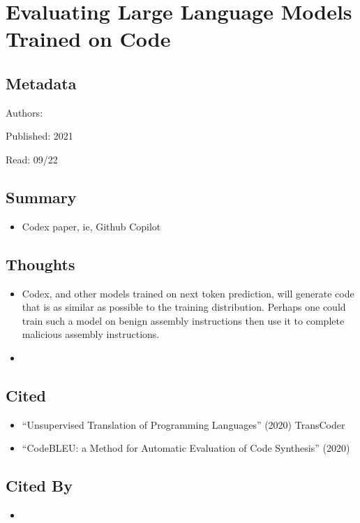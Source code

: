 \documentclass{article}
\begin{document}
\pagebreak


\section*{Evaluating Large Language Models Trained on Code}

\subsection*{Metadata}

\noindent Authors: 

\noindent Published: 2021

\noindent Read: 09/22

\subsection*{Summary}
\begin{itemize}
	\item Codex paper, ie, Github Copilot
\end{itemize}

\subsection*{Thoughts}
\begin{itemize}
	\item Codex, and other models trained on next token prediction, will generate code that is as similar as possible to the training distribution. Perhaps one could train such a model on benign assembly instructions then use it to complete malicious assembly instructions.
	\item 
\end{itemize}

\subsection*{Cited}
\begin{itemize}
	\item ``Unsupervised Translation of Programming Languages'' (2020) TransCoder
	\item ``CodeBLEU: a Method for Automatic Evaluation of Code Synthesis'' (2020)
\end{itemize}

\subsection*{Cited By}
\begin{itemize}
	\item
\end{itemize}
\end{document}
